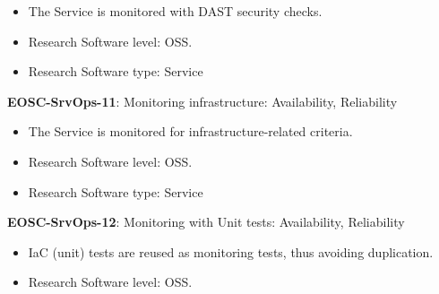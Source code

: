 \begin{itemize}
    \item The Service is monitored with DAST security checks.~\cite{orviz_fernandez_eosc-synergy_2020}
    \item Research Software level: OSS.
    \item Research Software type: Service
\end{itemize}

\textbf{EOSC-SrvOps-11}: Monitoring infrastructure: Availability, Reliability

\begin{itemize}
    \item The Service is monitored for infrastructure-related criteria.~\cite{orviz_fernandez_eosc-synergy_2020}
    \item Research Software level: OSS.
    \item Research Software type: Service
\end{itemize}

\textbf{EOSC-SrvOps-12}: Monitoring with Unit tests: Availability, Reliability

\begin{itemize}
    \item IaC (unit) tests are reused as monitoring tests, thus avoiding duplication.~\cite{orviz_fernandez_eosc-synergy_2020}
    \item Research Software level: OSS.
\end{itemize}

